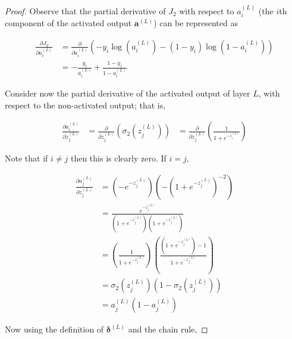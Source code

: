 \documentclass{article}[11pt]
\begin{document}
        \begin{proof}
            
            Observe that the partial derivative of $J_2$ with respect to $a^{(L)}_i$ (the $i$th component of the activated output $\mathbf{a}^{(L)}$) can be represented as
                    
            $$ \begin{aligned}
            \frac{\partial J_2}{\partial a^{(L)}_i}
            &= \frac{\partial}{\partial a^{(L)}_i} \left( - y_i \log(a^{(L)}_i) - (1 - y_i) \log(1 - a^{(L)}_i) \right) \\
            &= - \frac{y_i}{a^{(L)}_i} + \frac{1 - y_i}{1 - a^{(L)}_i}
            \end{aligned} $$
            
            Consider now the partial derivative of the activated output of layer $L$, with respect to the non-activated output; that is,
            
            $$ \begin{aligned}
            \frac{\partial a^{(L)}_i}{\partial z^{(L)}_j}
            &= \frac{\partial}{\partial z^{(L)}_j} \left( \sigma_2(z^{(L)}_j) \right)
            &= \frac{\partial}{\partial z^{(L)}_j} \left( \frac{1}{1 + e^{-z^{(L)}_i}} \right)
            \end{aligned} $$
                
            Note that if $i \neq j$ then this is clearly zero. If $i = j$,
            
            $$ \begin{aligned}
            \frac{\partial a^{(L)}_j}{\partial z^{(L)}_j}
            &= \left( - e^{-z^{(L)}_j} \right) \left( - \left( 1 + e^{-z^{(L)}_j} \right)^{-2} \right) \\
            &= \frac{e^{-z^{(L)}_j}}{\left( 1 + e^{-z^{(L)}_j} \right) \left( 1 + e^{-z^{(L)}_j} \right)} \\
            &= \left( \frac{1}{1 + e^{-z^{(L)}_j}} \right) \left( \frac{\left( 1 + e^{-z^{(L)}_j} \right) - 1}{1 + e^{-z^{(L)}_j}} \right) \\
            &= \sigma_2(z^{(L)}_j) \left( 1 - \sigma_2(z^{(L)}_j) \right) \\
            &= a^{(L)}_j \left( 1 - a^{(L)}_j \right)
            \end{aligned} $$
            
            Now using the definition of $\boldsymbol{\delta}^{(L)}$ and the chain rule,
            

\end{proof}
\end{document}
